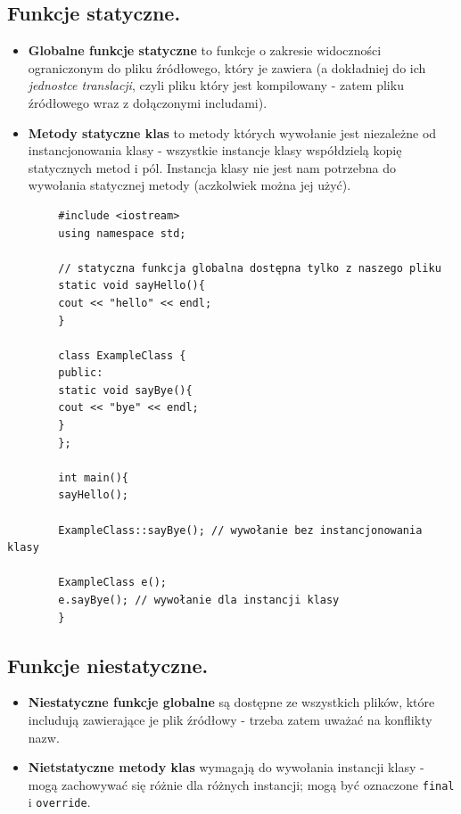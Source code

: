 \documentclass[12pt]{article}
\begin{document}
    \subsection{Funkcje statyczne.}
    \begin{itemize}
        \item \textbf{Globalne funkcje statyczne} to funkcje o zakresie widoczności ograniczonym do pliku źródłowego, który je
        zawiera (a dokładniej do ich \textit{jednostce translacji}, czyli pliku który jest kompilowany - zatem pliku
        źródłowego wraz z dołączonymi includami).
        \item \textbf{Metody statyczne klas} to metody których wywołanie jest niezależne od instancjonowania klasy -
        wszystkie instancje klasy współdzielą kopię statycznych metod i pól. Instancja klasy nie jest nam potrzebna
        do wywołania statycznej metody (aczkolwiek można jej użyć).
    \end{itemize}

    \begin{verbatim}
        #include <iostream>
        using namespace std;

        // statyczna funkcja globalna dostępna tylko z naszego pliku
        static void sayHello(){
        cout << "hello" << endl;
        }

        class ExampleClass {
        public:
        static void sayBye(){
        cout << "bye" << endl;
        }
        };

        int main(){
        sayHello();

        ExampleClass::sayBye(); // wywołanie bez instancjonowania klasy

        ExampleClass e();
        e.sayBye(); // wywołanie dla instancji klasy
        }
    \end{verbatim}

    \subsection{Funkcje niestatyczne.}
    \begin{itemize}
        \item \textbf{Niestatyczne funkcje globalne} są dostępne ze wszystkich plików, które includują zawierające
        je plik źródłowy - trzeba zatem uważać na konflikty nazw.
        \item \textbf{Nietstatyczne metody klas} wymagają do wywołania instancji klasy - mogą zachowywać się różnie
        dla różnych instancji; mogą być oznaczone \texttt{final} i \texttt{override}.
    \end{itemize}
\end{document}
